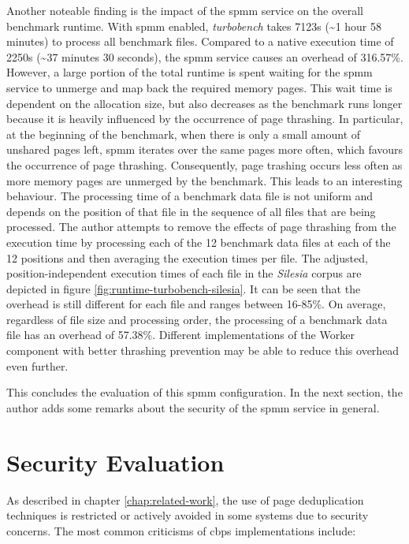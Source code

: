 Another noteable finding is the impact of the \ac{spmm} service on the overall benchmark runtime.
With \ac{spmm} enabled, \textit{turbobench} takes 7123s (\textasciitilde{}1 hour 58 minutes) to process all benchmark files.
Compared to a native execution time of 2250s (\textasciitilde{}37 minutes 30 seconds), the \ac{spmm} service causes an overhead of 316.57\%.
However, a large portion of the total runtime is spent waiting for the \ac{spmm} service to unmerge and map back the required memory pages.
This wait time is dependent on the allocation size, but also decreases as the benchmark runs longer because it is heavily influenced by the occurrence of page thrashing.
In particular, at the beginning of the benchmark, when there is only a small amount of unshared pages left, \ac{spmm} iterates over the same pages more often, which favours the occurrence of page thrashing.
Consequently, page trashing occurs less often as more memory pages are unmerged by the benchmark.
This leads to an interesting behaviour.
The processing time of a benchmark data file is not uniform and depends on the position of that file in the sequence of all files that are being processed.
The author attempts to remove the effects of page thrashing from the execution time by processing each of the 12 benchmark data files at each of the 12 positions and then averaging the execution times per file.
The adjusted, position-independent execution times of each file in the \textit{Silesia} corpus are depicted in figure \ref{fig:runtime-turbobench-silesia}.
It can be seen that the overhead is still different for each file and ranges between 16-85\%.
On average, regardless of file size and processing order, the processing of a benchmark data file has an overhead of 57.38\%.
Different implementations of the Worker component with better thrashing prevention may be able to reduce this overhead even further.

This concludes the evaluation of this \ac{spmm} configuration.
In the next section, the author adds some remarks about the security of the \ac{spmm} service in general.

\section{Security Evaluation}
\label{sec:security-evaluation}

As described in chapter \ref{chap:related-work}, the use of page deduplication techniques is restricted or actively avoided in some systems due to security concerns.
The most common criticisms of \ac{cbps} implementations include:

